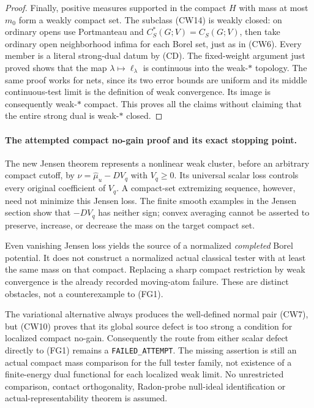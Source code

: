 \begin{proof}
Finally, positive measures supported in the compact $H$
with mass at most $m_0$ form a weakly compact set.
The subclass (CW14) is weakly closed: on ordinary
opens use Portmanteau and
$C_S^*(G;V)=C_S(G;V)$, then take ordinary open
neighborhood infima for each Borel set, just as in
(CW6). Every member is a literal strong-dual datum
by (CD). The fixed-weight argument just proved shows
that the map $\lambda\mapsto\ell_\lambda$ is
continuous into the weak-$*$ topology. The same proof
works for nets, since its two error bounds are uniform
and its middle continuous-test limit is the definition
of weak convergence. Its image is consequently
weak-$*$ compact. This proves all the claims without
claiming that the entire strong dual is weak-$*$ closed.
\end{proof}

\paragraph{The attempted compact no-gain proof and its exact stopping point.}
The new Jensen theorem represents a nonlinear weak cluster,
before an arbitrary compact cutoff, by
$\nu=\widehat\mu_u-DV_q$ with $V_q\geq0$.
Its universal scalar loss controls every original coefficient
of $V_q$. A compact-set extremizing sequence, however, need
not minimize this Jensen loss. The finite smooth examples
in the Jensen section show that $-DV_q$ has neither sign;
convex averaging cannot be asserted to preserve, increase,
or decrease the mass on the target compact set.

Even vanishing Jensen loss yields the source of a normalized
\emph{completed} Borel potential. It does not construct a
normalized actual classical tester with at least the same
mass on that compact. Replacing a sharp compact restriction
by weak convergence is the already recorded moving-atom
failure. These are distinct obstacles, not a counterexample
to (FG1).

The variational alternative always produces the well-defined
normal pair (CW7), but (CW10) proves that its global source
defect is too strong a condition for localized compact no-gain.
Consequently the route from either scalar defect directly to
(FG1) remains a \texttt{FAILED\_ATTEMPT}. The missing
assertion is still an actual compact mass comparison for the
full tester family, not existence of a finite-energy dual
functional for each localized weak limit. No unrestricted
comparison, contact orthogonality, Radon-probe null-ideal
identification or actual-representability theorem is assumed.

